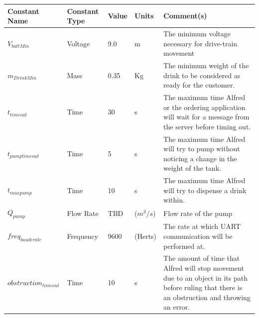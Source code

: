 \documentclass [10pt]{article}
\begin{document}
\begin{longtable}{| p{} | p{} | p{} | p{} | p{} |}\hline 
	\rowcolor{tableCell}\textbf{Constant Name} & \textbf{Constant Type} & \textbf{Value} & \textbf{Units} & \textbf{Comment(s)} \\ \hline
 	$ V_{battMin} $ & Voltage & 9.0& m &  The minimum voltage necessary for drive-train movement \\ \hline
	\rowcolor{tableCell}$ m_{DrinkMin} $ & Mass & 0.35 & Kg &  The minimum weight of the drink to be considered as ready for the customer.  \\ \hline
	$ t_{timeout} $ & Time & 30 & s & The maximum time Alfred or the ordering application will wait for a message from the server before timing out.  \\ \hline
	\rowcolor{tableCell}$ t_{pumptimeout} $ & Time & 5 & s & The maximum time Alfred will try to pump without noticing a change in the weight of the tank.  \\ \hline
	$ t_{maxpump} $ & Time & 10 & s & The maximum time Alfred will try to dispense a drink within. \\ \hline
	\rowcolor{tableCell}$Q_{pump}$ & Flow Rate & TBD & ($m^3/s$) &  Flow rate of the pump\\ \hline
	$ freq_{bauderate} $ & Frequency & 9600 & (Herts) &  The  rate at which UART communication will be performed at.\\ \hline
	\rowcolor{tableCell}$ obstruction_{timeout} $ & Time & 10 & s & The amount of time that Alfred will stop movement due to an object in its path before ruling that there is an obstruction and throwing an error. \\ \hline
\end{longtable}


\end{document}
